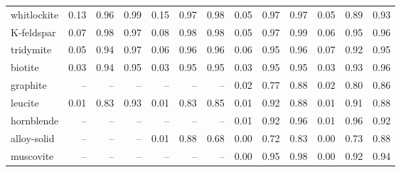 \begin{table}[!htbp]
\begin{tabular}{@{}l|rrr|rrr|rrr|rrr@{}}
whitlockite & 0.13 & \cellcolor[RGB]{250,229,227}0.96 & \cellcolor[RGB]{253,245,245}0.99 & 0.15 & \cellcolor[RGB]{251,231,230}0.97 & \cellcolor[RGB]{253,242,242}0.98 & 0.05 & \cellcolor[RGB]{251,232,230}0.97 & \cellcolor[RGB]{252,236,234}0.97 & 0.05 & \cellcolor[RGB]{243,184,180}0.89 & \cellcolor[RGB]{247,206,203}0.93 \\
K-feldspar & 0.07 & \cellcolor[RGB]{253,241,240}0.98 & \cellcolor[RGB]{252,235,233}0.97 & 0.08 & \cellcolor[RGB]{253,243,242}0.98 & \cellcolor[RGB]{252,240,239}0.98 & 0.05 & \cellcolor[RGB]{251,232,231}0.97 & \cellcolor[RGB]{254,247,247}0.99 & 0.06 & \cellcolor[RGB]{250,224,222}0.95 & \cellcolor[RGB]{250,227,226}0.96 \\
tridymite & 0.05 & \cellcolor[RGB]{249,218,215}0.94 & \cellcolor[RGB]{251,232,231}0.97 & 0.06 & \cellcolor[RGB]{250,226,224}0.96 & \cellcolor[RGB]{251,230,229}0.96 & 0.06 & \cellcolor[RGB]{249,219,217}0.95 & \cellcolor[RGB]{251,230,228}0.96 & 0.07 & \cellcolor[RGB]{246,202,199}0.92 & \cellcolor[RGB]{249,219,217}0.95 \\
biotite & 0.03 & \cellcolor[RGB]{248,216,214}0.94 & \cellcolor[RGB]{250,223,221}0.95 & 0.03 & \cellcolor[RGB]{249,221,219}0.95 & \cellcolor[RGB]{249,218,216}0.95 & 0.03 & \cellcolor[RGB]{250,223,221}0.95 & \cellcolor[RGB]{249,221,219}0.95 & 0.03 & \cellcolor[RGB]{247,208,206}0.93 & \cellcolor[RGB]{250,228,226}0.96 \\
graphite & -- & -- & -- & -- & -- & -- & 0.02 & \cellcolor[RGB]{232,120,112}0.77 & \cellcolor[RGB]{241,173,168}0.88 & 0.02 & \cellcolor[RGB]{232,120,112}0.80 & \cellcolor[RGB]{238,158,152}0.86 \\
leucite & 0.01 & \cellcolor[RGB]{236,141,135}0.83 & \cellcolor[RGB]{247,207,205}0.93 & 0.01 & \cellcolor[RGB]{235,137,130}0.83 & \cellcolor[RGB]{238,156,150}0.85 & 0.01 & \cellcolor[RGB]{246,201,198}0.92 & \cellcolor[RGB]{241,174,170}0.88 & 0.01 & \cellcolor[RGB]{244,192,189}0.91 & \cellcolor[RGB]{241,174,169}0.88 \\
hornblende & -- & -- & -- & -- & -- & -- & 0.01 & \cellcolor[RGB]{246,200,196}0.92 & \cellcolor[RGB]{250,226,224}0.96 & 0.01 & \cellcolor[RGB]{250,225,223}0.96 & \cellcolor[RGB]{246,204,201}0.92 \\
alloy-solid & -- & -- & -- & 0.01 & \cellcolor[RGB]{242,176,171}0.88 & \cellcolor[RGB]{232,120,112}0.68 & 0.00 & \cellcolor[RGB]{232,120,112}0.72 & \cellcolor[RGB]{235,138,131}0.83 & 0.00 & \cellcolor[RGB]{232,120,112}0.73 & \cellcolor[RGB]{241,171,166}0.88 \\
muscovite & -- & -- & -- & -- & -- & -- & 0.00 & \cellcolor[RGB]{250,224,223}0.95 & \cellcolor[RGB]{252,239,238}0.98 & 0.00 & \cellcolor[RGB]{246,202,199}0.92 & \cellcolor[RGB]{248,214,212}0.94 \\

\end{tabular}
\end{table}
